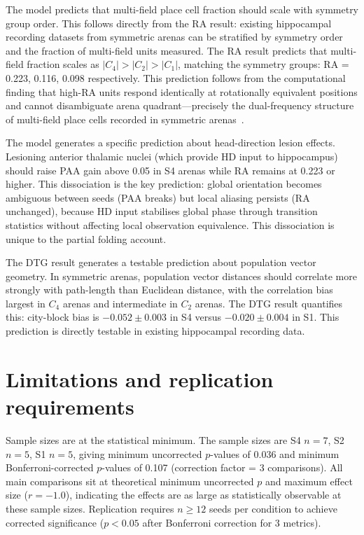 \documentclass[11pt, a4paper]{article}
\begin{document}
The model predicts that multi-field place cell fraction should scale with symmetry group order. This follows directly from the RA result: existing hippocampal recording datasets from symmetric arenas can be stratified by symmetry order and the fraction of multi-field units measured. The RA result predicts that multi-field fraction scales as $|C_4| > |C_2| > |C_1|$, matching the symmetry groups: RA = 0.223, 0.116, 0.098 respectively. This prediction follows from the computational finding that high-RA units respond identically at rotationally equivalent positions and cannot disambiguate arena quadrant---precisely the dual-frequency structure of multi-field place cells recorded in symmetric arenas~\cite{muller1987, knierim1995}.

The model generates a specific prediction about head-direction lesion effects. Lesioning anterior thalamic nuclei (which provide HD input to hippocampus) should raise PAA gain above 0.05 in S4 arenas while RA remains at 0.223 or higher. This dissociation is the key prediction: global orientation becomes ambiguous between seeds (PAA breaks) but local aliasing persists (RA unchanged), because HD input stabilises global phase through transition statistics without affecting local observation equivalence. This dissociation is unique to the partial folding account.

The DTG result generates a testable prediction about population vector geometry. In symmetric arenas, population vector distances should correlate more strongly with path-length than Euclidean distance, with the correlation bias largest in $C_4$ arenas and intermediate in $C_2$ arenas. The DTG result quantifies this: city-block bias is $-0.052 \pm 0.003$ in S4 versus $-0.020 \pm 0.004$ in S1. This prediction is directly testable in existing hippocampal recording data.



\section*{Limitations and replication requirements}

Sample sizes are at the statistical minimum. The sample sizes are S4 $n=7$, S2 $n=5$, S1 $n=5$, giving minimum uncorrected $p$-values of 0.036 and minimum Bonferroni-corrected $p$-values of 0.107 (correction factor = 3 comparisons). All main comparisons sit at theoretical minimum uncorrected $p$ and maximum effect size ($r = -1.0$), indicating the effects are as large as statistically observable at these sample sizes. Replication requires $n \geq 12$ seeds per condition to achieve corrected significance ($p < 0.05$ after Bonferroni correction for 3 metrics).
\end{document}
